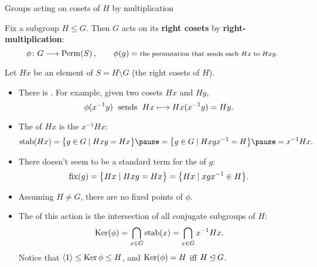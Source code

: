 \documentclass[8pt, handout]{beamer}
\newcommand{\Pause}{\pause}      %
\begin{document}

\begin{frame}{Groups acting on cosets of $H$ by multiplication} %
  
  Fix a subgroup $H\leq G$. Then $G$ acts on its \textbf{right cosets}
  by \textbf{right-multiplication}:
  \[
  \phi\colon G\longrightarrow\operatorname{Perm}(S)\,,\qquad
  \phi(g)=\mbox{\footnotesize the permutation that sends each $Hx$ to
    $Hxg$.}
  \]
  
  \Pause
  
  Let $Hx$ be an element of $S=H\!\setminus\!G$ (the right cosets of
  $H$). \Pause
  \begin{itemize}
  \item There is . \Pause For example, given two cosets
    $Hx$ and $Hy$,
    \[
    \text{$\phi(x^{-1}y)$\; sends\; $Hx\longmapsto Hx(x^{-1}y)=Hy$}.
    \]   
    \vspace{-4mm}\Pause
  \item The  of $Hx$ is the
     $x^{-1}Hx$: 
    \[
    \stab(Hx)=\big\{g\in G\mid Hxg=Hx\big\}\Pause=\big\{g\in G\mid
    Hxgx^{-1}=H\big\} \Pause=x^{-1}Hx.
    \]
    \vspace{-4mm}\Pause    
  \item There doesn't seem to be a standard term for the
     of $g$:
    \[
    \operatorname{fix}(g)=\big\{Hx\mid Hxg=Hx\big\}=\big\{Hx\mid xgx^{-1}\in H\big\}.
    \]
    \vspace{-4mm}\Pause
  \item Assuming $H\neq G$, there are {\color{xGreen}no fixed
    points} of $\phi$. 

    \smallskip\Pause
    
  \item The  of this action is the intersection of all
    conjugate subgroups of $H$:
    \[
    \operatorname{Ker}(\phi)=\bigcap_{x\in G}\operatorname{stab}(x)=\bigcap_{x\in G}x^{-1}Hx.
    \]
    \Pause Notice that $\langle1\rangle\leq\operatorname{Ker}\phi\leq H$, and $\operatorname{Ker}(\phi)=H$ iff
    $H\unlhd G$.
  \end{itemize}
  
\end{frame}

\end{document}
